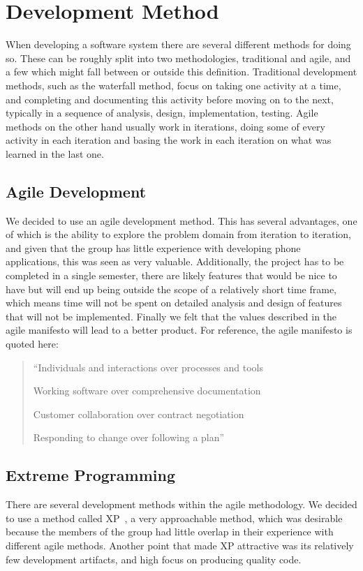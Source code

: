\section{Development Method}
When developing a software system there are several different methods for doing so. These can be roughly split into two methodologies, traditional and agile, and a few which might fall between or outside this definition. Traditional development methods, such as the waterfall method, focus on taking one activity at a time, and completing and documenting this activity before moving on to the next, typically in a sequence of analysis, design, implementation, testing. Agile methods on the other hand usually work in iterations, doing some of every activity in each iteration and basing the work in each iteration on what was learned in the last one.

\subsection{Agile Development}
We decided to use an agile development method. This has several advantages, one of which is the ability to explore the problem domain from iteration to iteration, and given that the group has little experience with developing phone applications, this was seen as very valuable. Additionally, the project has to be completed in a single semester, there are likely features that would be nice to have but will end up being outside the scope of a relatively short time frame, which means time will not be spent on detailed analysis and design of features that will not be implemented. Finally we felt that the values described in the agile manifesto will lead to a better product. For reference, the agile manifesto is quoted here:

\begin{quotation}
``Individuals and interactions over processes and tools

Working software over comprehensive documentation

Customer collaboration over contract negotiation

Responding to change over following a plan''~\citep{shitmanifesto}
\end{quotation}

\subsection{Extreme Programming}
There are several development methods within the agile methodology. We decided to use a method called \ac{XP}~\citep{beck04}, a very approachable method, which was desirable because the members of the group had little overlap in their experience with different agile methods. Another point that made \ac{XP} attractive was its relatively few development artifacts, and high focus on producing quality code.

